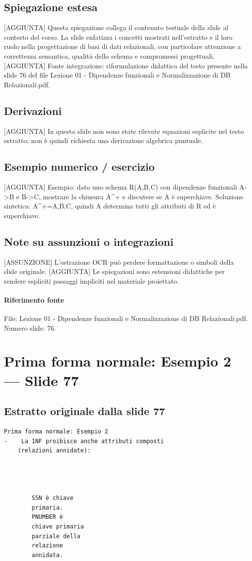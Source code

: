 \documentclass[11pt]{article}
\begin{document}
\subsection*{Spiegazione estesa}
[AGGIUNTA] Questa spiegazione collega il contenuto testuale della slide al contesto del corso. La slide enfatizza i concetti mostrati nell'estratto e il loro ruolo nella progettazione di basi di dati relazionali, con particolare attenzione a correttezza semantica, qualità dello schema e compromessi progettuali.
[AGGIUNTA] Fonte integrazione: riformulazione didattica del testo presente nella slide 76 del file Lezione 01 - Dipendenze funzionali e Normalizzazione di DB Relazionali.pdf.
\subsection*{Derivazioni}
[AGGIUNTA] In questa slide non sono state rilevate equazioni esplicite nel testo estratto; non è quindi richiesta una derivazione algebrica puntuale.
\subsection*{Esempio numerico / esercizio}
[AGGIUNTA] Esempio: dato uno schema R(A,B,C) con dipendenze funzionali A->B e B->C, mostrare la chiusura A^+ e discutere se A è superchiave. Soluzione sintetica: A^+={A,B,C}, quindi A determina tutti gli attributi di R ed è superchiave.
\subsection*{Note su assunzioni o integrazioni}
[ASSUNZIONE] L'estrazione OCR può perdere formattazione o simboli della slide originale.
[AGGIUNTA] Le spiegazioni sono estensioni didattiche per rendere espliciti passaggi impliciti nel materiale proiettato.
\paragraph{Riferimento fonte} File: Lezione 01 - Dipendenze funzionali e Normalizzazione di DB Relazionali.pdf. Numero slide: 76.
\section{Prima forma normale: Esempio 2 --- Slide 77}
\subsection*{Estratto originale dalla slide 77}
\begin{lstlisting}
Prima forma normale: Esempio 2
-    La 1NF proibisce anche attributi composti
    (relazioni annidate):




        SSN è chiave
        primaria.
        PNUMBER è
        chiave primaria
        parziale della
        relazione
        annidata.
\end{lstlisting}
\end{document}
